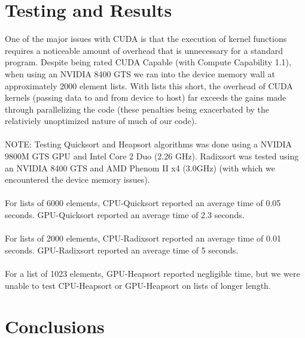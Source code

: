 \documentclass{article}
\begin{document}
\section{Testing and Results}

One of the major issues with CUDA is that the execution of kernel functions requires a noticeable amount of overhead that is unnecessary for a standard program. Despite being rated CUDA Capable (with Compute Capability 1.1), when using an NVIDIA 8400 GTS we ran into the device memory wall at approximately 2000 element lists. With lists this short, the overhead of CUDA kernels (passing data to and from device to host) far exceeds the gains made through parallelizing the code (these penalties being exacerbated by the relativiely unoptimized nature of much of our code).\\
\\
NOTE: Testing Quicksort and Heapsort algorithms was done using a NVIDIA 9800M GTS GPU and Intel Core 2 Duo (2.26 GHz). Radixsort was tested using an NVIDIA 8400 GTS and AMD Phenom II x4 (3.0GHz) (with which we encountered the device memory issues).\\
\\
For lists of 6000 elements, CPU-Quicksort reported an average time of 0.05 seconds. GPU-Quicksort reported an average time of 2.3 seconds.\\
\\
For lists of 2000 elements, CPU-Radixsort reported an average time of 0.01 seconds. GPU-Radixsort reported an average time of 5 seconds.\\
\\
For a list of 1023 elements, GPU-Heapsort reported negligible time, but we were unable to test CPU-Heapsort or GPU-Heapsort on lists of longer length.\\

\section{Conclusions}
\end{document}
